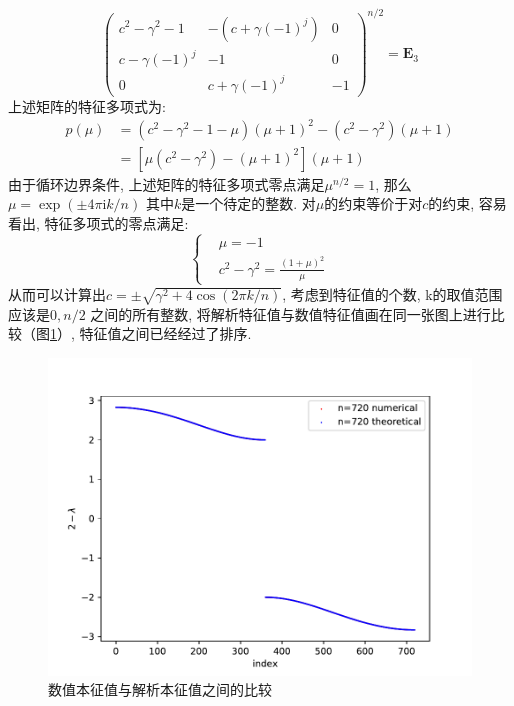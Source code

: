 \documentclass[a4paper,zihao=5,UTF8]{ctexart}
\def\i{\mathrm{i}}
\newcommand{\mb}[1]{\mathbf{#1}}
\begin{document}
	\begin{equation}
		\begin{pmatrix}
			c^2 - \gamma^2 - 1 & -(c + \gamma(-1)^j) &0 \\
			c - \gamma(-1)^j & -1 & 0\\
			0 & c + \gamma(-1)^j & -1
		\end{pmatrix}^{n/2} = \mb{E}_3
	\end{equation}
	上述矩阵的特征多项式为:
	\begin{equation}
		\begin{aligned}
			p(\mu) &= (c^2 - \gamma^2 - 1 - \mu)(\mu + 1)^2 - (c^2 - \gamma^2)(\mu + 1)\\
			& = \left[\mu(c^2 - \gamma^2) - (\mu + 1)^2\right](\mu + 1)
		\end{aligned}
	\end{equation}
	由于循环边界条件, 上述矩阵的特征多项式零点满足$\mu^{n/2} = 1$, 那么$\mu = \exp(\pm4\pi\i k/n)$
	其中$k$是一个待定的整数. 对$\mu$的约束等价于对$c$的约束, 容易看出, 特征多项式的零点满足:
	\begin{equation}
		\left\{
			\begin{aligned}
				&\mu = -1\\
				&c^2 - \gamma^2 = \frac{(1 + \mu)^2}{\mu}
			\end{aligned}
		\right.
	\end{equation}
	从而可以计算出$c = \pm\sqrt{\gamma^2 + 4\cos(2\pi k / n)}$, 考虑到特征值的个数, k的取值范围应该是$0, n/2$
	之间的所有整数, 将解析特征值与数值特征值画在同一张图上进行比较（图\ref{3 compare}）, 特征值之间已经经过了排序.
	\begin{figure}[htbp]
		\centering
		\includegraphics[scale=0.6]{3_compare.pdf}
		\caption{数值本征值与解析本征值之间的比较}
		\label{3 compare}
	\end{figure}
\end{document}
